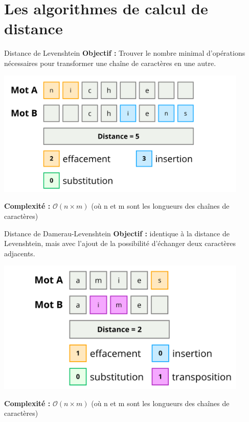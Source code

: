 \section{Les algorithmes de calcul de distance}


\begin{frame}{Distance de Levenshtein}
	\textbf{Objectif : }Trouver le nombre minimal d'opérations nécessaires pour transformer une chaîne de caractères en une autre.
	\begin{center}
		\includegraphics[width=0.9\textwidth]{images/levenshtein.png}
	\end{center}
	\textbf{Complexité : }  $\mathcal{O}(n \times m)$ (où n et m sont les longueurs des chaînes de caractères)
\end{frame}

\begin{frame}{Distance de Damerau-Levenshtein}
	\vspace*{-0.3cm}
	\textbf{Objectif : }identique à la distance de Levenshtein, mais avec l'ajout de la possibilité d'échanger deux caractères adjacents.
	\begin{center}
		\includegraphics[width=0.9\textwidth]{images/damerau-levenshtein.png}
	\end{center}
	\textbf{Complexité : }  $\mathcal{O}(n \times m)$ (où n et m sont les longueurs des chaînes de caractères)
\end{frame}

